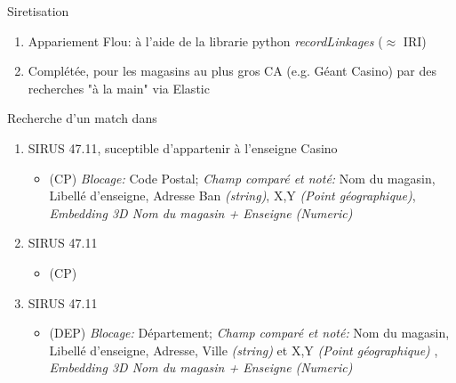 \documentclass[ignorenonframetext,]{beamer}
\begin{document}
\begin{frame}{}
\end{frame}

\begin{frame}{Siretisation}
\begin{enumerate}
    \item Appariement Flou: à l'aide de la librarie python \textit{recordLinkages} ($\approx$ IRI)
    \item Complétée, pour les magasins au plus gros CA (e.g. Géant Casino) par des recherches "à la main" via Elastic
\end{enumerate}

Recherche d'un match dans
\begin{enumerate}
    \item SIRUS 47.11, suceptible d'appartenir à l'enseigne Casino
    \begin{itemize}
    \item (CP) \textit{Blocage:} Code Postal; \textit{Champ comparé et noté:} Nom du magasin, Libellé d'enseigne, Adresse Ban \textit{(string)}, X,Y \textit{(Point géographique)}, \textit{Embedding 3D Nom du magasin + Enseigne} \textit{(Numeric)}
    \end{itemize}
    \item SIRUS 47.11 
    \begin{itemize}
        \item (CP)
    \end{itemize}
    \item SIRUS 47.11 
    \begin{itemize}
        \item  (DEP) \textit{Blocage:} Département; \textit{Champ comparé et noté:} Nom du magasin, Libellé d'enseigne, Adresse, Ville \textit{(string)} et X,Y \textit{(Point géographique)} , \textit{Embedding 3D Nom du magasin + Enseigne} \textit{(Numeric)}
\end{itemize}
\end{enumerate}

\end{frame}
\end{document}
